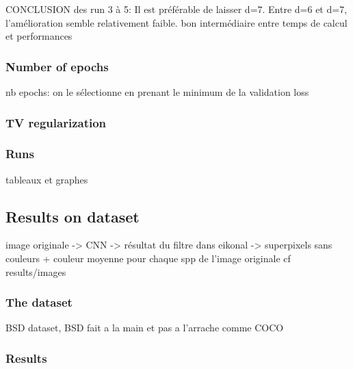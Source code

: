 \documentclass{article}
\begin{document}
        CONCLUSION des run 3 à 5: Il est préférable de laisser d=7. Entre d=6 et d=7, l'amélioration semble
        relativement faible.
        bon intermédiaire entre temps de calcul et performances

        \subsubsection{Number of epochs}
    nb epochs: on le sélectionne en prenant le minimum de la validation loss
        \subsubsection{TV regularization}

        \subsubsection{Runs}
        tableaux et graphes
    \subsection{Results on dataset}
    image originale -> CNN -> résultat du filtre dans eikonal -> superpixels sans couleurs + couleur moyenne pour chaque spp de l'image originale
    cf results/images


        \subsubsection{The dataset}
        BSD dataset, BSD fait a la main et pas a l'arrache comme COCO
        \subsubsection{Results}
\end{document}
